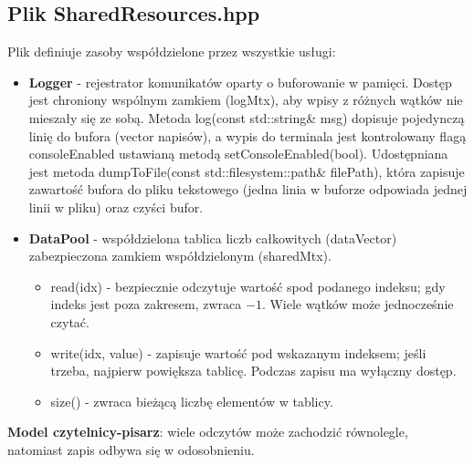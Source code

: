 \documentclass[a4paper,12pt]{article}
\begin{document}
        \subsection{Plik SharedResources.hpp}
            \vspace{-0.2em}
            Plik definiuje zasoby współdzielone przez wszystkie usługi:
                \begin{itemize}
                    \item \textbf{Logger} - rejestrator komunikatów oparty o buforowanie w pamięci. Dostęp jest chroniony wspólnym zamkiem (logMtx), aby wpisy z różnych wątków nie mieszały się ze sobą. Metoda log(const std::string\& msg) dopisuje pojedynczą linię do bufora (vector napisów), a wypis do terminala jest kontrolowany flagą consoleEnabled ustawianą metodą setConsoleEnabled(bool). Udostępniana jest metoda dumpToFile(const std::filesystem::path\& filePath), która zapisuje zawartość bufora do pliku tekstowego (jedna linia w buforze odpowiada jednej linii w pliku) oraz czyści bufor.
                    \item \textbf{DataPool} - współdzielona tablica liczb całkowitych (dataVector) zabezpieczona zamkiem współdzielonym (sharedMtx).
                    \begin{itemize}
                        \item read(idx) - bezpiecznie odczytuje wartość spod podanego indeksu; gdy indeks jest poza zakresem, zwraca \(-1\). Wiele wątków może jednocześnie czytać.
                        \item write(idx, value) - zapisuje wartość pod wskazanym indeksem; jeśli trzeba, najpierw powiększa tablicę. Podczas zapisu ma wyłączny dostęp.
                        \item size() - zwraca bieżącą liczbę elementów w tablicy.
                    \end{itemize}
                \end{itemize}
                	\textbf{Model czytelnicy-pisarz}: wiele odczytów może zachodzić równolegle, natomiast zapis odbywa się w odosobnieniu.
            \vspace{1em}
\end{document}
